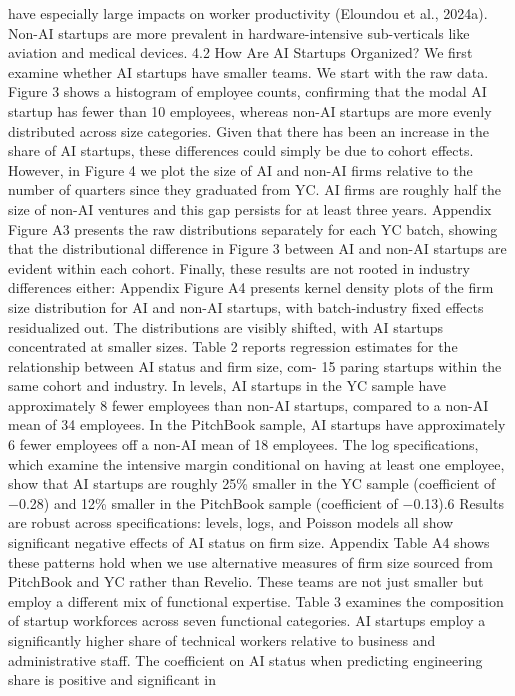 have especially large impacts on worker productivity (Eloundou et al., 2024a). Non-AI startups are
more prevalent in hardware-intensive sub-verticals like aviation and medical devices.
4.2
How Are AI Startups Organized?
We first examine whether AI startups have smaller teams. We start with the raw data. Figure 3
shows a histogram of employee counts, confirming that the modal AI startup has fewer than 10
employees, whereas non-AI startups are more evenly distributed across size categories. Given that
there has been an increase in the share of AI startups, these differences could simply be due to
cohort effects. However, in Figure 4 we plot the size of AI and non-AI firms relative to the number
of quarters since they graduated from YC. AI firms are roughly half the size of non-AI ventures
and this gap persists for at least three years. Appendix Figure A3 presents the raw distributions
separately for each YC batch, showing that the distributional difference in Figure 3 between AI and
non-AI startups are evident within each cohort. Finally, these results are not rooted in industry
differences either: Appendix Figure A4 presents kernel density plots of the firm size distribution for
AI and non-AI startups, with batch-industry fixed effects residualized out. The distributions are
visibly shifted, with AI startups concentrated at smaller sizes.
Table 2 reports regression estimates for the relationship between AI status and firm size, com-
15
paring startups within the same cohort and industry. In levels, AI startups in the YC sample have
approximately 8 fewer employees than non-AI startups, compared to a non-AI mean of 34 employees.
In the PitchBook sample, AI startups have approximately 6 fewer employees off a non-AI mean of
18 employees. The log specifications, which examine the intensive margin conditional on having at
least one employee, show that AI startups are roughly 25\% smaller in the YC sample (coefficient of
−0.28) and 12\% smaller in the PitchBook sample (coefficient of −0.13).6 Results are robust across
specifications: levels, logs, and Poisson models all show significant negative effects of AI status on
firm size. Appendix Table A4 shows these patterns hold when we use alternative measures of firm
size sourced from PitchBook and YC rather than Revelio.
These teams are not just smaller but employ a different mix of functional expertise. Table 3
examines the composition of startup workforces across seven functional categories.
AI startups
employ a significantly higher share of technical workers relative to business and administrative
staff. The coefficient on AI status when predicting engineering share is positive and significant in

